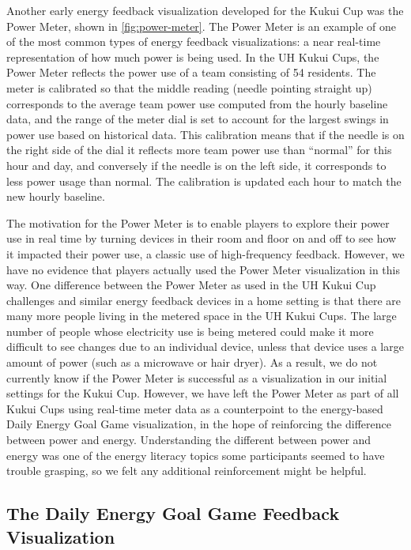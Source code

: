\documentclass[10pt, conference, compsocconf]{IEEEtran-old}
\begin{document}
Another early energy feedback visualization developed for the Kukui Cup was the Power Meter, shown in \autoref{fig:power-meter}. The Power Meter is an example of one of the most common types of energy feedback visualizations: a near real-time representation of how much power is being used. In the UH Kukui Cups, the Power Meter reflects the power use of a team consisting of 54 residents. The meter is calibrated so that the middle reading (needle pointing straight up) corresponds to the average team power use computed from the hourly baseline data, and the range of the meter dial is set to account for the largest swings in power use based on historical data. This calibration means that if the needle is on the right side of the dial it reflects more team power use than ``normal'' for this hour and day, and conversely if the needle is on the left side, it corresponds to less power usage than normal. The calibration is updated each hour to match the new hourly baseline.

The motivation for the Power Meter is to enable players to explore their power use in real time by turning devices in their room and floor on and off to see how it impacted their power use, a classic use of high-frequency feedback. However, we have no evidence that players actually used the Power Meter visualization in this way. One difference between the Power Meter as used in the UH Kukui Cup challenges and similar energy feedback devices in a home setting is that there are many more people living in the metered space in the UH Kukui Cups. The large number of people whose electricity use is being metered could make it more difficult to see changes due to an individual device, unless that device uses a large amount of power (such as a microwave or hair dryer). As a result, we do not currently know if the Power Meter is successful as a visualization in our initial settings for the Kukui Cup. However, we have left the Power Meter as part of all Kukui Cups using real-time meter data as a counterpoint to the energy-based Daily Energy Goal Game visualization, in the hope of reinforcing the difference between power and energy. Understanding the different between power and energy was one of the energy literacy topics some participants seemed to have trouble grasping, so we felt any additional reinforcement might be helpful.

\subsection{The Daily Energy Goal Game Feedback Visualization}
\end{document}
